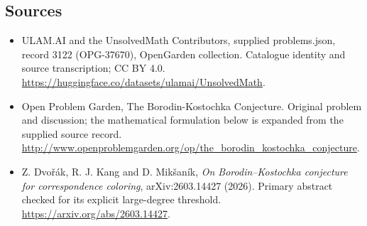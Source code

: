 \documentclass[11pt,a4paper]{article}
\begin{document}
\subsection{Sources}
\begin{itemize}
\item[S1] ULAM.AI and the UnsolvedMath Contributors, supplied problems.json, record 3122 (OPG-37670), OpenGarden collection. Catalogue identity and source transcription; CC BY 4.0.
\url{https://huggingface.co/datasets/ulamai/UnsolvedMath}.
\item[S2] Open Problem Garden, The Borodin-Kostochka Conjecture. Original problem and discussion; the mathematical formulation below is expanded from the supplied source record.
\url{http://www.openproblemgarden.org/op/the_borodin_kostochka_conjecture}.
\item[R1] Z. Dvořák, R. J. Kang and D. Mikšaník, \emph{On Borodin--Kostochka conjecture for correspondence coloring}, arXiv:2603.14427 (2026). Primary abstract checked for its explicit large-degree threshold.
\url{https://arxiv.org/abs/2603.14427}.
\end{itemize}
\end{document}
